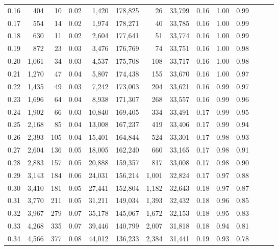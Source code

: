 \begin{tabular}{rrrrrrrrrrrrrr}
0.16 &    404 &     10 &  0.02 &    1,420 &  178,825 &      26 &  33,799 &  0.16 &  1.00 &      0.99 \\
0.17 &    554 &     14 &  0.02 &    1,974 &  178,271 &      40 &  33,785 &  0.16 &  1.00 &      0.99 \\
0.18 &    630 &     11 &  0.02 &    2,604 &  177,641 &      51 &  33,774 &  0.16 &  1.00 &      0.99 \\
0.19 &    872 &     23 &  0.03 &    3,476 &  176,769 &      74 &  33,751 &  0.16 &  1.00 &      0.98 \\
0.20 &  1,061 &     34 &  0.03 &    4,537 &  175,708 &     108 &  33,717 &  0.16 &  1.00 &      0.98 \\
0.21 &  1,270 &     47 &  0.04 &    5,807 &  174,438 &     155 &  33,670 &  0.16 &  1.00 &      0.97 \\
0.22 &  1,435 &     49 &  0.03 &    7,242 &  173,003 &     204 &  33,621 &  0.16 &  0.99 &      0.97 \\
0.23 &  1,696 &     64 &  0.04 &    8,938 &  171,307 &     268 &  33,557 &  0.16 &  0.99 &      0.96 \\
0.24 &  1,902 &     66 &  0.03 &   10,840 &  169,405 &     334 &  33,491 &  0.17 &  0.99 &      0.95 \\
0.25 &  2,168 &     85 &  0.04 &   13,008 &  167,237 &     419 &  33,406 &  0.17 &  0.99 &      0.94 \\
0.26 &  2,393 &    105 &  0.04 &   15,401 &  164,844 &     524 &  33,301 &  0.17 &  0.98 &      0.93 \\
0.27 &  2,604 &    136 &  0.05 &   18,005 &  162,240 &     660 &  33,165 &  0.17 &  0.98 &      0.91 \\
0.28 &  2,883 &    157 &  0.05 &   20,888 &  159,357 &     817 &  33,008 &  0.17 &  0.98 &      0.90 \\
0.29 &  3,143 &    184 &  0.06 &   24,031 &  156,214 &   1,001 &  32,824 &  0.17 &  0.97 &      0.88 \\
0.30 &  3,410 &    181 &  0.05 &   27,441 &  152,804 &   1,182 &  32,643 &  0.18 &  0.97 &      0.87 \\
0.31 &  3,770 &    211 &  0.05 &   31,211 &  149,034 &   1,393 &  32,432 &  0.18 &  0.96 &      0.85 \\
0.32 &  3,967 &    279 &  0.07 &   35,178 &  145,067 &   1,672 &  32,153 &  0.18 &  0.95 &      0.83 \\
0.33 &  4,268 &    335 &  0.07 &   39,446 &  140,799 &   2,007 &  31,818 &  0.18 &  0.94 &      0.81 \\
0.34 &  4,566 &    377 &  0.08 &   44,012 &  136,233 &   2,384 &  31,441 &  0.19 &  0.93 &      0.78 \\

\end{tabular}
